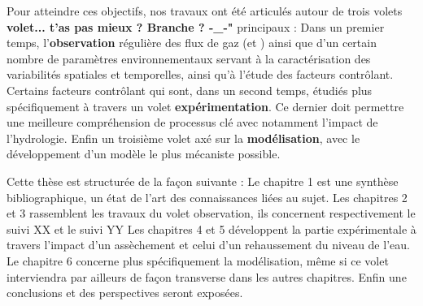 Pour atteindre ces objectifs, nos travaux ont été articulés autour de trois volets \textbf{volet... t'as pas mieux ? Branche ? -\_-"} principaux :
Dans un premier temps, l'\textbf{observation} régulière des flux de gaz (\coo et \chh) ainsi que d'un certain nombre de paramètres environnementaux servant à la caractérisation des variabilités spatiales et temporelles, ainsi qu'à l'étude des facteurs contrôlant.
Certains facteurs contrôlant qui sont, dans un second temps, étudiés plus spécifiquement à travers un volet \textbf{expérimentation}.
Ce dernier doit permettre une meilleure compréhension de processus clé avec notamment l'impact de l'hydrologie.
Enfin un troisième volet axé sur la \textbf{modélisation}, avec le développement d'un modèle le plus mécaniste possible.


Cette thèse est structurée de la façon suivante :
Le chapitre 1 est une synthèse bibliographique, un état de l'art des connaissances liées au sujet.
Les chapitres 2 et 3 rassemblent les travaux du volet observation, ils concernent respectivement le suivi XX et le suivi YY 
Les chapitres 4 et 5 développent la partie expérimentale à travers l'impact d'un assèchement et celui d'un rehaussement du niveau de l'eau.
Le chapitre 6 concerne plus spécifiquement la modélisation, même si ce volet interviendra par ailleurs de façon transverse dans les autres chapitres.
Enfin une conclusions et des perspectives seront exposées.


%

